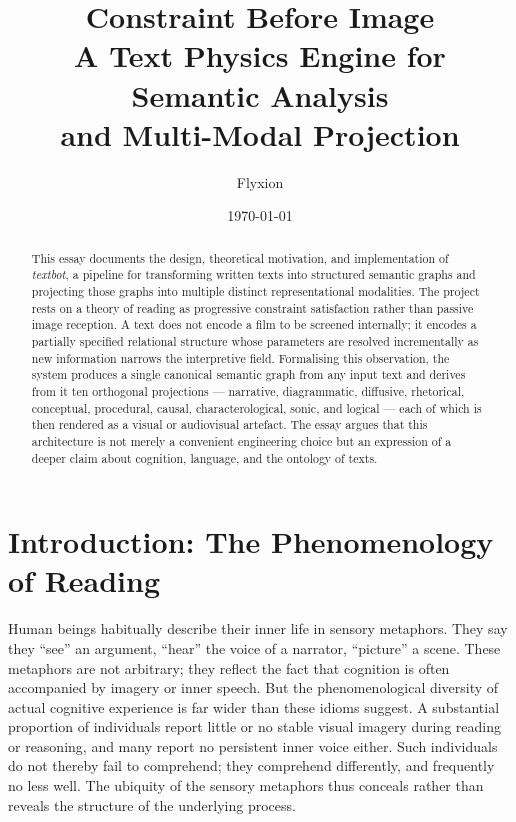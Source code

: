 \documentclass[12pt, a4paper]{article}
\title{\textbf{Constraint Before Image}\\[0.5em]
\large A Text Physics Engine for Semantic Analysis\\and Multi-Modal Projection}
\author{Flyxion}
\date{\today}
\begin{document}
\maketitle
\thispagestyle{empty}

\begin{abstract}
\noindent
This essay documents the design, theoretical motivation, and implementation of \textit{textbot}, a pipeline for transforming written texts into structured semantic graphs and projecting those graphs into multiple distinct representational modalities. The project rests on a theory of reading as progressive constraint satisfaction rather than passive image reception. A text does not encode a film to be screened internally; it encodes a partially specified relational structure whose parameters are resolved incrementally as new information narrows the interpretive field. Formalising this observation, the system produces a single canonical semantic graph from any input text and derives from it ten orthogonal projections — narrative, diagrammatic, diffusive, rhetorical, conceptual, procedural, causal, characterological, sonic, and logical — each of which is then rendered as a visual or audiovisual artefact. The essay argues that this architecture is not merely a convenient engineering choice but an expression of a deeper claim about cognition, language, and the ontology of texts.
\end{abstract}

\newpage
\tableofcontents
\newpage

\section{Introduction: The Phenomenology of Reading}

Human beings habitually describe their inner life in sensory metaphors. They say they \enquote{see} an argument, \enquote{hear} the voice of a narrator, \enquote{picture} a scene. These metaphors are not arbitrary; they reflect the fact that cognition is often accompanied by imagery or inner speech. But the phenomenological diversity of actual cognitive experience is far wider than these idioms suggest. A substantial proportion of individuals report little or no stable visual imagery during reading or reasoning, and many report no persistent inner voice either. Such individuals do not thereby fail to comprehend; they comprehend differently, and frequently no less well. The ubiquity of the sensory metaphors thus conceals rather than reveals the structure of the underlying process.
\end{document}
